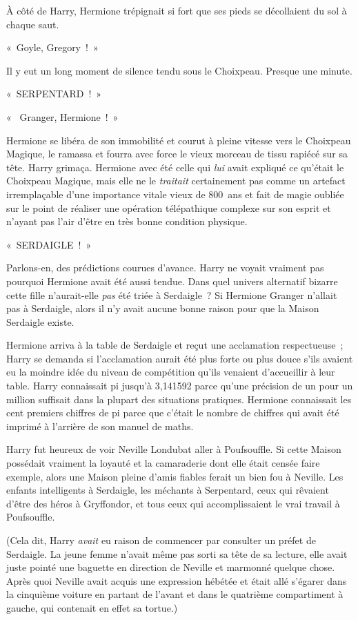 À côté de Harry, Hermione trépignait si fort que ses pieds se décollaient du sol à chaque saut.

«~Goyle, Gregory~!~»

Il y eut un long moment de silence tendu sous le Choixpeau. Presque une minute.

«~SERPENTARD~!~»

«~ Granger, Hermione~!~»

Hermione se libéra de son immobilité et courut à pleine vitesse vers le Choixpeau Magique, le ramassa et fourra avec force le vieux morceau de tissu rapiécé sur sa tête. Harry grimaça. Hermione avec été celle qui \emph{lui} avait expliqué ce qu'était le Choixpeau Magique, mais elle ne le \emph{traitait} certainement pas comme un artefact irremplaçable d'une importance vitale vieux de 800~ans et fait de magie oubliée sur le point de réaliser une opération télépathique complexe sur son esprit et n'ayant pas l'air d'être en très bonne condition physique.

«~SERDAIGLE~!~»

Parlons-en, des prédictions courues d'avance. Harry ne voyait vraiment pas pourquoi Hermione avait été aussi tendue. Dans quel univers alternatif bizarre cette fille n'aurait-elle \emph{pas} été triée à Serdaigle~? Si Hermione Granger n'allait pas à Serdaigle, alors il n'y avait aucune bonne raison pour que la Maison Serdaigle existe.

Hermione arriva à la table de Serdaigle et reçut une acclamation respectueuse~; Harry se demanda si l'acclamation aurait été plus forte ou plus douce s'ils avaient eu la moindre idée du niveau de compétition qu'ils venaient d'accueillir à leur table. Harry connaissait pi jusqu'à 3,141592 parce qu'une précision de un pour un million suffisait dans la plupart des situations pratiques. Hermione connaissait les cent premiers chiffres de pi parce que c'était le nombre de chiffres qui avait été imprimé à l'arrière de son manuel de maths.

Harry fut heureux de voir Neville Londubat aller à Poufsouffle. Si cette Maison possédait vraiment la loyauté et la camaraderie dont elle était censée faire exemple, alors une Maison pleine d'amis fiables ferait un bien fou à Neville. Les enfants intelligents à Serdaigle, les méchants à Serpentard, ceux qui rêvaient d'être des héros à Gryffondor, et tous ceux qui accomplissaient le vrai travail à Poufsouffle.

(Cela dit, Harry \emph{avait} eu raison de commencer par consulter un préfet de Serdaigle. La jeune femme n'avait même pas sorti sa tête de sa lecture, elle avait juste pointé une baguette en direction de Neville et marmonné quelque chose. Après quoi Neville avait acquis une expression hébétée et était allé s'égarer dans la cinquième voiture en partant de l'avant et dans le quatrième compartiment à gauche, qui contenait en effet sa tortue.)

